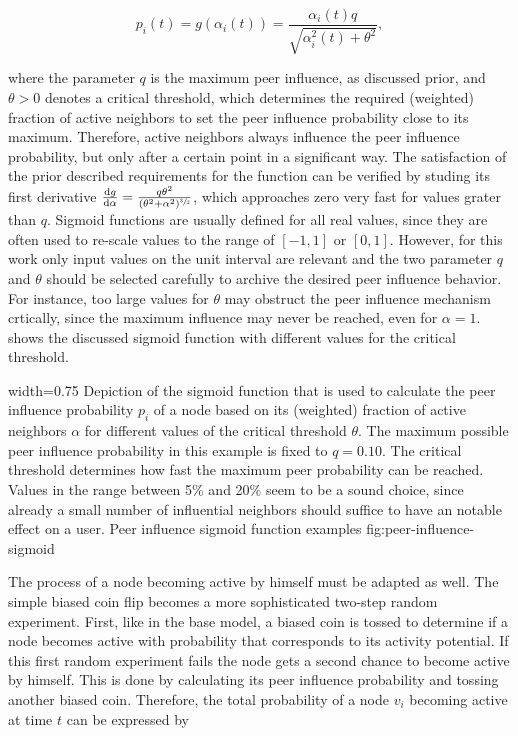 \begin{equation}
    p_{i}(t) = g(\alpha_{i}(t)) = \frac{\alpha_{i}(t) q}{\sqrt{\alpha_{i}^{2}(t) + \theta^2}},
\end{equation}

where the parameter \( q \) is the maximum peer influence, as discussed prior, and \( \theta > 0 \) denotes a critical threshold, which determines the required (weighted) fraction of active neighbors to set the peer influence probability close to its maximum.
Therefore, active neighbors always influence the peer influence probability, but only after a certain point in a significant way.
The satisfaction of the prior described requirements for the function can be verified by studing its first derivative \( \frac{\mathrm{d} g}{\mathrm{d} \alpha} = \frac{q \theta^{2}}{(\theta^2 + \alpha^2)^{\sfrac{3}{2}}}  \), which approaches zero very fast for values grater than \( q \).
Sigmoid functions are usually defined for all real values, since they are often used to re-scale values to the range of \([-1, 1] \) or \( [0, 1] \).
However, for this work only input values on the unit interval are relevant and the two parameter \( q \) and \( \theta \) should be selected carefully to archive the desired peer influence behavior.
For instance, too large values for \( \theta \) may obstruct the peer influence mechanism crtically, since the maximum influence may never be reached, even for \( \alpha = 1 \).
 shows the discussed sigmoid function with different values for the critical threshold.


      {width=0.75\textwidth}
      {Depiction of the sigmoid function that is used to calculate the peer influence probability \(p_{i} \) of a node based on its (weighted) fraction of active neighbors \( \alpha \) for different values of the critical threshold \( \theta \). The maximum possible peer influence probability in this example is fixed to \( q = 0.10 \). The critical threshold determines how fast the maximum peer probability can be reached. Values in the range between 5\% and 20\% seem to be a sound choice, since already a small number of influential neighbors should suffice to have an notable effect on a user.}
      {Peer influence sigmoid function examples}
      {fig:peer-influence-sigmoid}


The process of a node becoming active by himself must be adapted as well.
The simple biased coin flip becomes a more sophisticated two-step random experiment.
First, like in the base model, a biased coin is tossed to determine if a node becomes active with probability that corresponds to its activity potential.
If this first random experiment fails the node gets a second chance to become active by himself.
This is done by calculating its peer influence probability and tossing another biased coin.
Therefore, the total probability of a node \( v_{i} \) becoming active at time \( t \) can be expressed by

